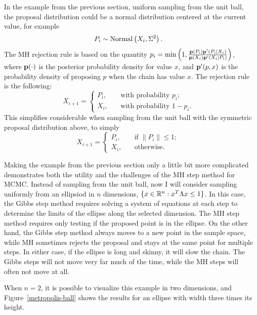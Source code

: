 In the example from the previous section, uniform sampling from the
unit ball, the proposal distribution could be a normal distribution centered at the current value, for example
\[
P_i \sim \operatorname{Normal}\left(X_i, \Sigma^2\right).
\]
The MH rejection rule is based on the quantity $p_i =
\min\left(1, \frac{\mathbf{p}(P_i)\mathbf{p}'(P_i|X_i)}{\mathbf{p}(X_i)\mathbf{p}'(X_i|P_i)}\right)$, where
$\mathbf{p}(\cdot)$ is the posterior probability density for value $x$, and
$\mathbf{p}'(p, x)$ is the probability density of proposing $p$ when the
chain has value $x$.  The rejection rule is the following:
\[
X_{i+1} = \begin{cases}
P_i, &\quad\text{with probability } p_i;\\
X_i, &\quad\text{with probability } 1-p_i.
\end{cases}
\]
This simplifies considerable when sampling from the unit ball with the
symmetric proposal distribution above, to simply
\[
X_{i+1} = \begin{cases}
P_i , &\quad\text{if }\|P_i\| \leq 1;\\
X_i, &\quad\text{otherwise}.
\end{cases}
\]

Making the example from the previous section only a little bit more
complicated demonstrates both the utility and the challenges of the MH
step method for MCMC.  Instead of sampling from the unit ball, now I
will consider sampling uniformly from an ellipsiod in $n$ dimensions,
$\{x\in \mathbb{R}^n : x^T \Lambda x \leq 1\}$.  In this case, the Gibbs
step method requires solving a system of equations at each step to
determine the limits of the ellipse along the selected dimension.  The
MH step method requires only testing if the proposed point is in the
ellipse.  On the other hand, the Gibbs step method always moves to a
new point in the sample space, while MH sometimes rejects the proposal
and stays at the same point for multiple steps.  In either case, if
the ellipse is long and skinny, it will slow the chain.  The Gibbs
steps will not move very far much of the time, while the MH steps will
often not move at all.

When $n=2$, it is possible to visualize this example in two
dimensions, and Figure~\ref{metropolis-ball} shows the results for an
ellipse with width three times its height.

